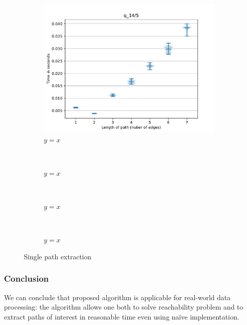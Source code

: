 \begin{figure}
     \begin{subfigure}[b]{0.24\textwidth}
         \centering
         \includegraphics[width=\textwidth]{data/res_graphics/q_14_5.pdf}
         \caption{$y=x$}
         \label{fig:y equals x}
     \end{subfigure}
     ~\begin{subfigure}[b]{0.24\textwidth}
         \centering
         \caption{$y=x$}
         \label{fig:y equals x}
     \end{subfigure}\\
     \begin{subfigure}[b]{0.24\textwidth}
         \centering
         \caption{$y=x$}
         \label{fig:y equals x}
     \end{subfigure}
     ~\begin{subfigure}[b]{0.24\textwidth}
         \centering
         \caption{$y=x$}
         \label{fig:y equals x}
     \end{subfigure}
   \caption{Single path extraction}
\end{figure}

\subsubsection{Conclusion}

We can conclude that proposed algorithm is applicable for real-world data processing: the algorithm allows one both to solve reachability problem and to extract paths of interest in reasonable time even using na{\"i}ve implementation.  

